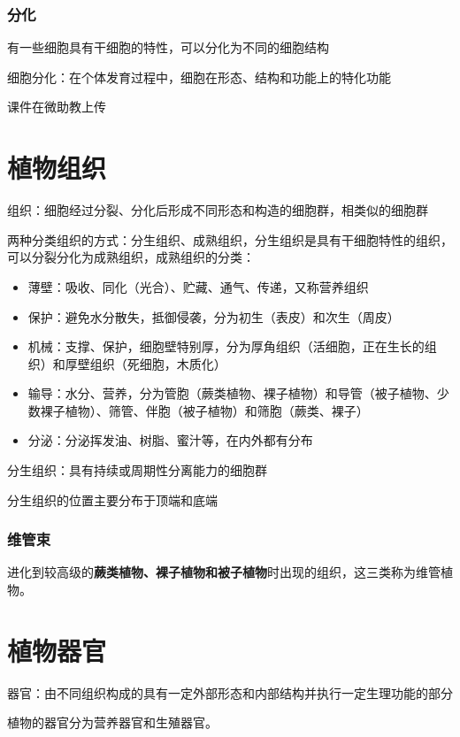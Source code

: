 \subsubsection*{分化}%
\label{subsub:分化}
有一些细胞具有干细胞的特性，可以分化为不同的细胞结构
\begin{defi}
    细胞分化：在个体发育过程中，细胞在形态、结构和功能上的特化功能
\end{defi}
课件在微助教上传
\section{植物组织}%
\label{sec:植物组织}
\begin{defi}
    组织：细胞经过分裂、分化后形成不同形态和构造的细胞群，相类似的细胞群
\end{defi}
两种分类组织的方式：分生组织、成熟组织，分生组织是具有干细胞特性的组织，可以分裂分化为成熟组织，成熟组织的分类：
\begin{itemize}
    \item 薄壁：吸收、同化（光合）、贮藏、通气、传递，又称营养组织
    \item 保护：避免水分散失，抵御侵袭，分为初生（表皮）和次生（周皮）
    \item 机械：支撑、保护，细胞壁特别厚，分为厚角组织（活细胞，正在生长的组织）和厚壁组织（死细胞，木质化）
    \item 输导：水分、营养，分为管胞（蕨类植物、裸子植物）和导管（被子植物、少数裸子植物）、筛管、伴胞（被子植物）和筛胞（蕨类、裸子）
    \item 分泌：分泌挥发油、树脂、蜜汁等，在内外都有分布
    
\end{itemize}
\begin{defi}
分生组织：具有持续或周期性分离能力的细胞群
\end{defi}
分生组织的位置主要分布于顶端和底端
\subsubsection*{维管束}%
\label{subsub:维管束}
进化到较高级的\textbf{蕨类植物、裸子植物和被子植物}时出现的组织，这三类称为维管植物。

\section{植物器官}%
\label{sec:植物器官}
\begin{defi}
    器官：由不同组织构成的具有一定外部形态和内部结构并执行一定生理功能的部分
\end{defi}
植物的器官分为营养器官和生殖器官。
